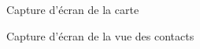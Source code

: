 \begin{figure}[H]
    \label{fig-carte}
    \noindent{}
    \caption{Capture d'écran de la carte}
\end{figure}

\begin{figure}[H]
    \label{fig-contact}
    \noindent{}
    \caption{Capture d'écran de la vue des contacts}
\end{figure}

